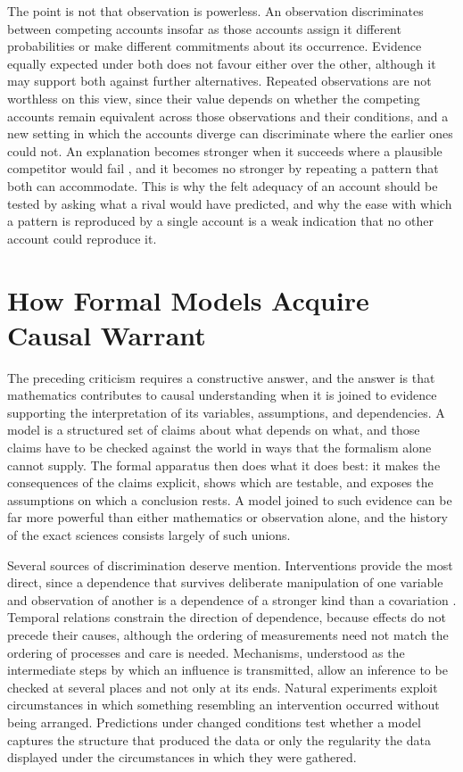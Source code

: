 \documentclass[11pt,letterpaper]{article}
\theoremstyle{definition}
\begin{document}
The point is not that observation is powerless. An observation discriminates between competing accounts insofar as those accounts assign it different probabilities or make different commitments about its occurrence. Evidence equally expected under both does not favour either over the other, although it may support both against further alternatives. Repeated observations are not worthless on this view, since their value depends on whether the competing accounts remain equivalent across those observations and their conditions, and a new setting in which the accounts diverge can discriminate where the earlier ones could not. An explanation becomes stronger when it succeeds where a plausible competitor would fail \cite{lipton2004}, and it becomes no stronger by repeating a pattern that both can accommodate. This is why the felt adequacy of an account should be tested by asking what a rival would have predicted, and why the ease with which a pattern is reproduced by a single account is a weak indication that no other account could reproduce it.

\section{How Formal Models Acquire Causal Warrant}

The preceding criticism requires a constructive answer, and the answer is that mathematics contributes to causal understanding when it is joined to evidence supporting the interpretation of its variables, assumptions, and dependencies. A model is a structured set of claims about what depends on what, and those claims have to be checked against the world in ways that the formalism alone cannot supply. The formal apparatus then does what it does best: it makes the consequences of the claims explicit, shows which are testable, and exposes the assumptions on which a conclusion rests. A model joined to such evidence can be far more powerful than either mathematics or observation alone, and the history of the exact sciences consists largely of such unions.

Several sources of discrimination deserve mention. Interventions provide the most direct, since a dependence that survives deliberate manipulation of one variable and observation of another is a dependence of a stronger kind than a covariation \cite{woodward2003}. Temporal relations constrain the direction of dependence, because effects do not precede their causes, although the ordering of measurements need not match the ordering of processes and care is needed. Mechanisms, understood as the intermediate steps by which an influence is transmitted, allow an inference to be checked at several places and not only at its ends. Natural experiments exploit circumstances in which something resembling an intervention occurred without being arranged. Predictions under changed conditions test whether a model captures the structure that produced the data or only the regularity the data displayed under the circumstances in which they were gathered.
\end{document}
